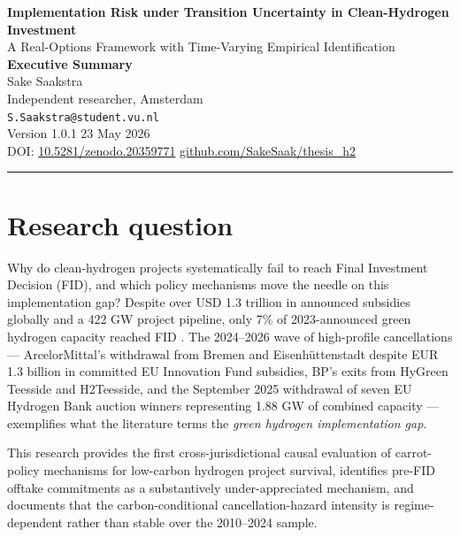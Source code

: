 \documentclass[11pt,a4paper]{article}
\begin{document}
\begin{center}
{\Large\bfseries Implementation Risk under Transition Uncertainty in Clean-Hydrogen Investment} \\[0.4em]
{\large A Real-Options Framework with Time-Varying Empirical Identification} \\[0.8em]
{\large\textbf{Executive Summary}} \\[1.2em]

Sake Saakstra \\
Independent researcher, Amsterdam \\
\texttt{S.Saakstra@student.vu.nl} \\[0.6em]

Version 1.0.1 \textbar{} 23 May 2026 \\
DOI: \href{https://doi.org/10.5281/zenodo.20359771}{10.5281/zenodo.20359771} \textbar{} \href{https://github.com/SakeSaak/thesis_h2}{github.com/SakeSaak/thesis\_h2}
\end{center}

\vspace{1.2em}

\noindent\rule{\textwidth}{0.4pt}
\vspace{0.4em}

\section*{Research question}

Why do clean-hydrogen projects systematically fail to reach Final Investment Decision (FID), and which policy mechanisms move the needle on this implementation gap? Despite over USD 1.3 trillion in announced subsidies globally and a 422 GW project pipeline, only 7\% of 2023-announced green hydrogen capacity reached FID \cite{odenweller2025green}. The 2024--2026 wave of high-profile cancellations --- ArcelorMittal's withdrawal from Bremen and Eisenhüttenstadt despite EUR 1.3 billion in committed EU Innovation Fund subsidies, BP's exits from HyGreen Teesside and H2Teesside, and the September 2025 withdrawal of seven EU Hydrogen Bank auction winners representing 1.88 GW of combined capacity --- exemplifies what the literature terms the \emph{green hydrogen implementation gap}.

This research provides the first cross-jurisdictional causal evaluation of carrot-policy mechanisms for low-carbon hydrogen project survival, identifies pre-FID offtake commitments as a substantively under-appreciated mechanism, and documents that the carbon-conditional cancellation-hazard intensity is regime-dependent rather than stable over the 2010--2024 sample.
\end{document}
